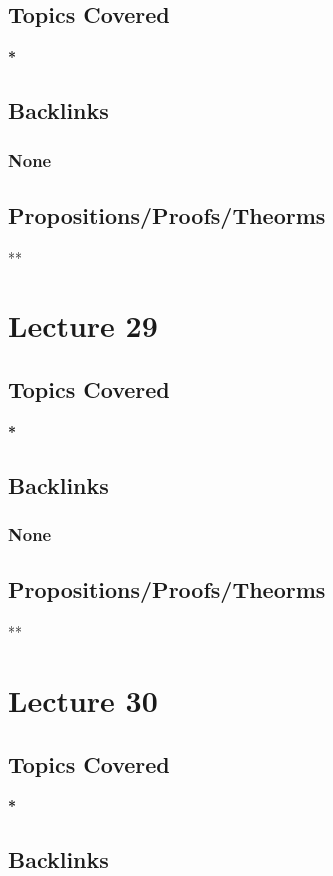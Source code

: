\documentclass[11pt]{article}
\begin{document}
\subsection*{Topics Covered}
\label{sec:org7ed8671}
\textbf{*}
\subsection*{Backlinks}
\label{sec:orgbde3a16}
\subsubsection*{None}
\label{sec:orga97a0e3}
\subsection*{Propositions/Proofs/Theorms}
\label{sec:org9d59397}
**

\section*{Lecture 29}
\label{sec:orgbd9971e}
\subsection*{Topics Covered}
\label{sec:org90d0400}
\textbf{*}
\subsection*{Backlinks}
\label{sec:org1513dff}
\subsubsection*{None}
\label{sec:orgec811cd}
\subsection*{Propositions/Proofs/Theorms}
\label{sec:org55196e4}
**

\section*{Lecture 30}
\label{sec:org0149856}
\subsection*{Topics Covered}
\label{sec:org76efd34}
\textbf{*}
\subsection*{Backlinks}
\label{sec:org49759a8}
\end{document}
